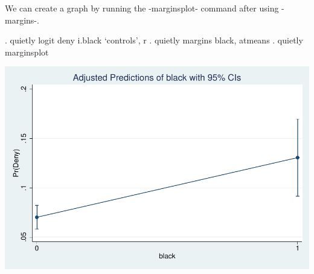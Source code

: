 \documentclass{scrartcl}
\begin{document}
We can create a graph by running the -marginsplot- command after using -margins-.
\begin{SinputC}
. quietly logit deny i.black `controls', r
. quietly margins black, atmeans
. quietly marginsplot
\end{SinputC}
\includegraphics[]{stock_watson-11-Stata-fig.pdf}

\end{document}
